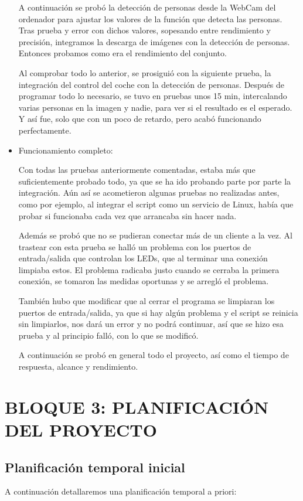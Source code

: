 \documentclass{pclass}
\begin{document}
\begin{itemize}
		A continuación se probó la detección de personas desde la WebCam del ordenador para ajustar los valores de la función que detecta las personas. Tras prueba y error con dichos valores, sopesando entre rendimiento y precisión, integramos la descarga de imágenes con la detección de personas. Entonces probamos como era el rendimiento del conjunto.
		
		Al comprobar todo lo anterior, se prosiguió con la siguiente prueba, la integración del control del coche con la detección de personas. Después de programar todo lo necesario, se tuvo en pruebas unos 15 min, intercalando varias personas en la imagen y nadie, para ver si el resultado es el esperado. Y así fue, solo que con un poco de retardo, pero acabó funcionando perfectamente. 		
		
		
	
	\item Funcionamiento completo:
	
		Con todas las pruebas anteriormente comentadas, estaba más que suficientemente probado todo, ya que se ha ido probando parte por parte la integración. Aún así se acometieron algunas pruebas no realizadas antes, como por ejemplo, al integrar el script como un servicio de Linux, había que probar si funcionaba cada vez que arrancaba sin hacer nada.
		
		Además se probó que no se pudieran conectar más de un cliente a la vez. Al trastear con esta prueba se halló un problema con los puertos de entrada/salida que controlan los LEDs, que al terminar una conexión limpiaba estos. El problema radicaba justo cuando se cerraba la primera conexión, se tomaron las medidas oportunas y se arregló el problema.
		
		También hubo que modificar que al cerrar el programa se limpiaran los puertos de entrada/salida, ya que si hay algún problema y el script se reinicia sin limpiarlos, nos dará un error y no podrá continuar, así que se hizo esa prueba y al principio falló, con lo que se modificó.
		
		A continuación se probó en general todo el proyecto, así como el tiempo de respuesta, alcance y rendimiento.	
		
	
\end{itemize}


\chapter{BLOQUE 3: PLANIFICACIÓN DEL PROYECTO}
\section{Planificación temporal inicial} 
A continuación detallaremos una planificación temporal a priori:
\end{document}
